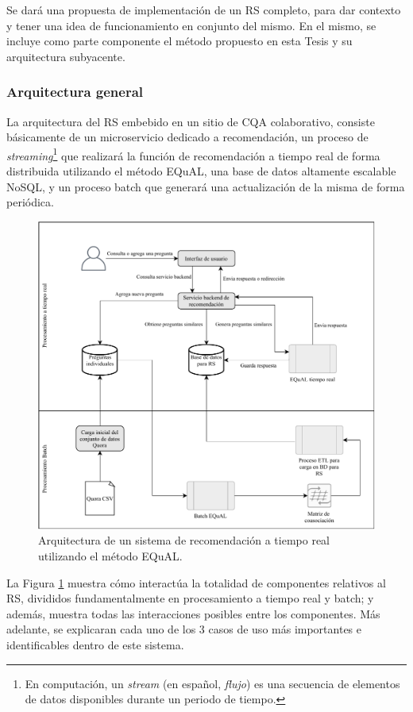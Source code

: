 \bigskip Se dará una propuesta de implementación de un RS completo, para dar contexto y tener una idea de funcionamiento en conjunto del mismo. En el mismo, se incluye como parte componente el método propuesto en esta Tesis y su arquitectura subyacente.

\subsubsection{Arquitectura general}
La arquitectura del RS embebido en un sitio de CQA colaborativo, consiste básicamente de un microservicio dedicado a recomendación, un proceso de \textit{streaming}\footnote{En computación, un \textit{stream} (en español, \textit{flujo}) es una secuencia de elementos de datos disponibles durante un periodo de tiempo.} que realizará la función de recomendación a tiempo real de forma distribuida utilizando el método EQuAL, una base de datos altamente escalable NoSQL, y un proceso batch que generará una actualización de la misma de forma periódica.

\begin{figure}
	\centering
	\includegraphics[width=0.9\linewidth]{8_problema_investigacion/imagenes/implementacion_rs}
	\caption{Arquitectura de un sistema de recomendación a tiempo real utilizando el método EQuAL.}
	\label{fig:implementacionrs}
\end{figure}

La Figura \ref{fig:implementacionrs} muestra cómo interactúa la totalidad de componentes relativos al RS, divididos fundamentalmente en procesamiento a tiempo real y batch; y además, muestra todas las interacciones posibles entre los componentes. Más adelante, se explicaran cada uno de los 3 casos de uso más importantes e identificables dentro de este sistema.

